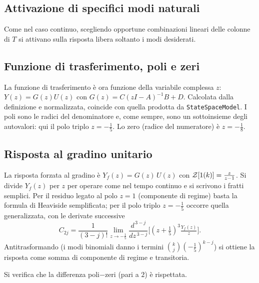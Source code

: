 
\subsection{Attivazione di specifici modi naturali}
Come nel caso continuo, scegliendo opportune combinazioni lineari delle colonne di $T$
si attivano sulla risposta libera soltanto i modi desiderati.


\subsection{Funzione di trasferimento, poli e zeri}
La funzione di trasferimento è ora funzione della variabile complessa $z$:
$Y(z)=G(z)U(z)$ con $G(z)=C(zI-A)^{-1}B+D$. Calcolata dalla definizione e normalizzata,
coincide con quella prodotta da \texttt{StateSpaceModel}. I poli sono le radici del
denominatore e, come sempre, sono un sottoinsieme degli autovalori: qui il polo triplo
$z=-\tfrac15$. Lo zero (radice del numeratore) è $z=-\tfrac18$.

\subsection{Risposta al gradino unitario}
La risposta forzata al gradino è $Y_f(z)=G(z)\,U(z)$ con $\mathcal{Z}[1(k)]=\tfrac{z}{z-1}$.
Si divide $Y_f(z)$ per $z$ per operare come nel tempo continuo e si scrivono i fratti
semplici. Per il residuo legato al polo $z=1$ (componente di regime) basta la formula di
Heaviside semplificata; per il polo triplo $z=-\tfrac15$ occorre quella generalizzata,
con le derivate successive
\[
C_{2j}=\frac{1}{(3-j)!}\lim_{z\to-\frac15}\frac{d^{\,3-j}}{dz^{\,3-j}}
\Big[(z+\tfrac15)^3\tfrac{Y_f(z)}{z}\Big].
\]
Antitrasformando (i modi binomiali danno i termini $\binom{k}{j}(-\tfrac15)^{k-j}$) si
ottiene la risposta come somma di componente di regime e transitoria.


Si verifica che la differenza poli$-$zeri (pari a $2$) è rispettata.

